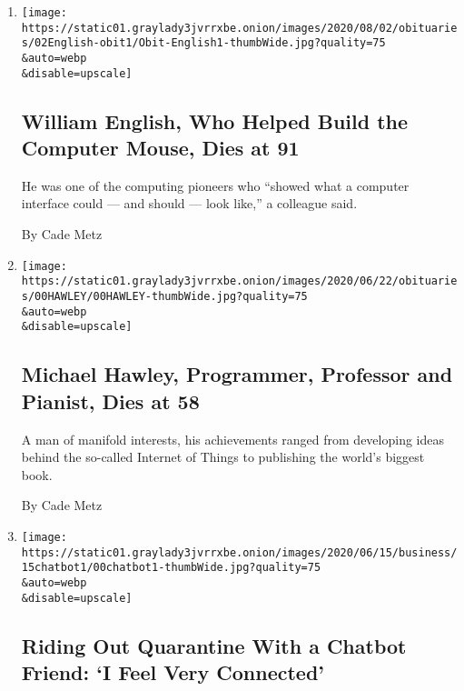 \begin{enumerate}
\def\labelenumi{\arabic{enumi}.}
\item
  \href{/2020/07/31/technology/william-english-who-helped-build-the-computer-mouse-dies-at-91.html}{}

  \texttt{[image: https://static01.graylady3jvrrxbe.onion/images/2020/08/02/obituaries/02English-obit1/Obit-English1-thumbWide.jpg?quality=75\\\&auto=webp\\\&disable=upscale]}

  \hypertarget{william-english-who-helped-build-the-computer-mouse-dies-at-91}{%
  \subsection{William English, Who Helped Build the Computer Mouse, Dies
  at
  91}\label{william-english-who-helped-build-the-computer-mouse-dies-at-91}}

  He was one of the computing pioneers who ``showed what a computer
  interface could --- and should --- look like,'' a colleague said.

  By Cade Metz
\item
  \href{/2020/06/24/technology/michael-hawley-dead.html}{}

  \texttt{[image: https://static01.graylady3jvrrxbe.onion/images/2020/06/22/obituaries/00HAWLEY/00HAWLEY-thumbWide.jpg?quality=75\\\&auto=webp\\\&disable=upscale]}

  \hypertarget{michael-hawley-programmer-professor-and-pianist-dies-at-58}{%
  \subsection{Michael Hawley, Programmer, Professor and Pianist, Dies at
  58}\label{michael-hawley-programmer-professor-and-pianist-dies-at-58}}

  A man of manifold interests, his achievements ranged from developing
  ideas behind the so-called Internet of Things to publishing the
  world's biggest book.

  By Cade Metz
\item
  \href{/2020/06/16/technology/chatbots-quarantine-coronavirus.html}{}

  \texttt{[image: https://static01.graylady3jvrrxbe.onion/images/2020/06/15/business/15chatbot1/00chatbot1-thumbWide.jpg?quality=75\\\&auto=webp\\\&disable=upscale]}

  \hypertarget{riding-out-quarantine-with-a-chatbot-friend-i-feel-very-connected}{%
  \subsection{Riding Out Quarantine With a Chatbot Friend: `I Feel Very
  Connected'}\label{riding-out-quarantine-with-a-chatbot-friend-i-feel-very-connected}}


\end{enumerate}
